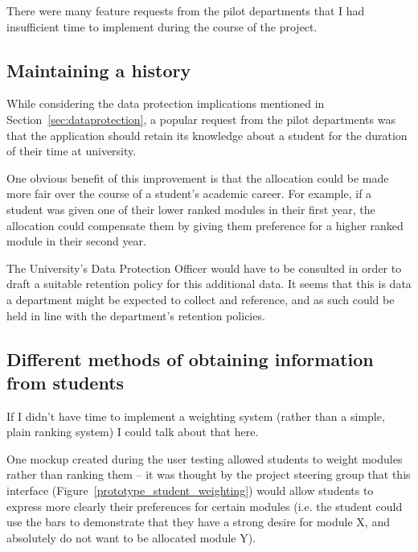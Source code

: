 \documentclass[draft]{scrartcl}
\begin{document}


There were many feature requests from the pilot departments that I had
insufficient time to implement during the course of the project.

\subsection{Maintaining a history}

While considering the data protection implications mentioned in
Section~\ref{sec:dataprotection}, a popular request from the pilot departments
was that the application should retain its knowledge about a student for the
duration of their time at university.

One obvious benefit of this improvement is that the allocation could be made
more fair over the course of a student's academic career. For example, if a
student was given one of their lower ranked modules in their first year, the
allocation could compensate them by giving them preference for a higher ranked
module in their second year.

The University's Data Protection Officer would have to be consulted in order
to draft a suitable retention policy for this additional data. It seems that
this is data a department might be expected to collect and reference, and as
such could be held in line with the department's retention policies.

\subsection{Different methods of obtaining information from students}

If I didn't have time to implement a weighting system (rather than a simple,
plain ranking system) I could talk about that here.

One mockup created during the user testing allowed students to weight modules
rather than ranking them -- it was thought by the project steering group that
this interface (Figure~\ref{prototype_student_weighting}) would allow students
to express more clearly their preferences for certain modules (i.e. the
student could use the bars to demonstrate that they have a strong desire for
module X, and absolutely do not want to be allocated module Y).
\end{document}
